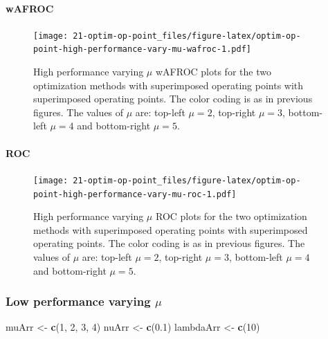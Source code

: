 \documentclass[
]{book}
\newenvironment{Shaded}{\begin{snugshade}}{\end{snugshade}}
\newcommand{\DecValTok}[1]{\textcolor[rgb]{0.00,0.00,0.81}{#1}}
\newcommand{\FloatTok}[1]{\textcolor[rgb]{0.00,0.00,0.81}{#1}}
\newcommand{\KeywordTok}[1]{\textcolor[rgb]{0.13,0.29,0.53}{\textbf{#1}}}
\newcommand{\NormalTok}[1]{#1}
\newcommand{\StringTok}[1]{\textcolor[rgb]{0.31,0.60,0.02}{#1}}
\begin{document}
\hypertarget{wafroc-5}{%
\paragraph{wAFROC}\label{wafroc-5}}

\begin{figure}
\centering
\texttt{[image: 21-optim-op-point\_files/figure-latex/optim-op-point-high-performance-vary-mu-wafroc-1.pdf]}
\caption{\label{fig:optim-op-point-high-performance-vary-mu-wafroc}High performance varying \(\mu\) wAFROC plots for the two optimization methods with superimposed operating points with superimposed operating points. The color coding is as in previous figures. The values of \(\mu\) are: top-left \(\mu = 2\), top-right \(\mu = 3\), bottom-left \(\mu = 4\) and bottom-right \(\mu = 5\).}
\end{figure}

\hypertarget{roc-5}{%
\paragraph{ROC}\label{roc-5}}

\begin{figure}
\centering
\texttt{[image: 21-optim-op-point\_files/figure-latex/optim-op-point-high-performance-vary-mu-roc-1.pdf]}
\caption{\label{fig:optim-op-point-high-performance-vary-mu-roc}High performance varying \(\mu\) ROC plots for the two optimization methods with superimposed operating points with superimposed operating points. The color coding is as in previous figures. The values of \(\mu\) are: top-left \(\mu = 2\), top-right \(\mu = 3\), bottom-left \(\mu = 4\) and bottom-right \(\mu = 5\).}
\end{figure}

\hypertarget{optim-op-point-low-performance-vary-mu}{%
\subsubsection{\texorpdfstring{Low performance varying \(\mu\)}{Low performance varying \textbackslash mu}}\label{optim-op-point-low-performance-vary-mu}}

\begin{Shaded}
\begin{Highlighting}[]
\NormalTok{muArr <-}\StringTok{ }\KeywordTok{c}\NormalTok{(}\DecValTok{1}\NormalTok{, }\DecValTok{2}\NormalTok{, }\DecValTok{3}\NormalTok{, }\DecValTok{4}\NormalTok{)}
\NormalTok{nuArr <-}\StringTok{ }\KeywordTok{c}\NormalTok{(}\FloatTok{0.1}\NormalTok{)}
\NormalTok{lambdaArr <-}\StringTok{ }\KeywordTok{c}\NormalTok{(}\DecValTok{10}\NormalTok{)}
\end{Highlighting}
\end{Shaded}
\end{document}
